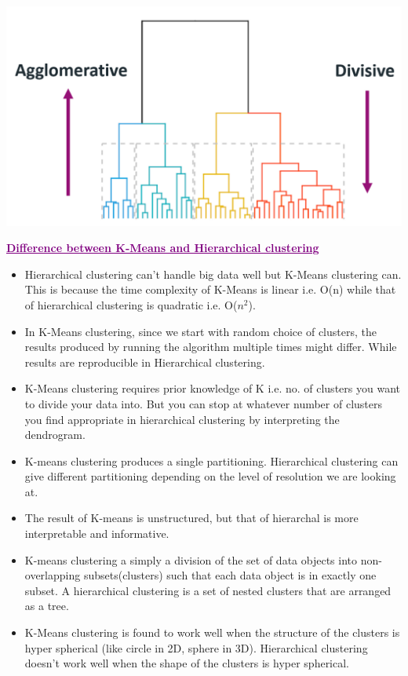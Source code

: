 \includegraphics[scale=0.40]{Images/A33_img2.png} 

\textcolor{purple}{\underline{\textbf{Difference between K-Means and Hierarchical clustering}}}
\begin{itemize}
    \item Hierarchical clustering can’t handle big data well but K-Means clustering can. This is because the time complexity of K-Means is linear i.e. O(n) while that of hierarchical clustering is quadratic i.e. O(${n^2}$). 
    \item In K-Means clustering, since we start with random choice of clusters, the results produced by running the algorithm multiple times might differ. While results are reproducible in Hierarchical clustering. 
    \item K-Means clustering requires prior knowledge of K i.e. no. of clusters you want to divide your data into. But you can stop at whatever number of clusters you find appropriate in hierarchical clustering by interpreting the dendrogram.
    \item K-means clustering produces a single partitioning. Hierarchical clustering can give different partitioning depending on the level of resolution we are looking at. 
    \item The result of K-means is unstructured, but that of hierarchal is more interpretable and informative.
    \item K-means clustering a simply a division of the set of data objects into non-overlapping subsets(clusters) such that each data object is in exactly one subset. A hierarchical clustering is a set of nested clusters that are arranged as a tree.
    \item K-Means clustering is found to work well when the structure of the clusters is hyper spherical (like circle in 2D, sphere in 3D). Hierarchical clustering doesn’t work well when the shape of the clusters is hyper spherical.
    
\end{itemize} \\